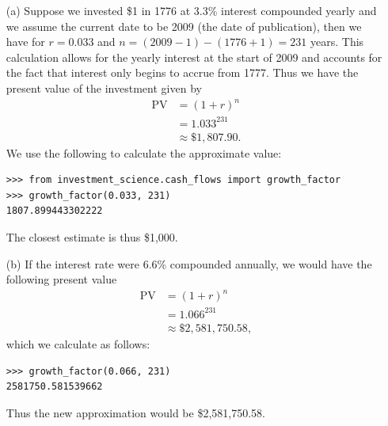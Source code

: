 \begin{itemize}
    \item[(a)] Suppose we invested \$1 in 1776 at 3.3\% interest compounded
        yearly and we assume the current date to be 2009 (the date of
        publication), then we have for $r = 0.033$ and
        $n = (2009 - 1) - (1776 + 1) = 231$ years. This calculation allows for
        the yearly interest at the start of 2009 and accounts for the fact that
        interest only begins to accrue from 1777. Thus we have the present value
        of the investment given by
        \begin{equation*}
            \begin{split}
                \text{PV} &= {(1 + r)}^n \\
                &= {1.033}^{231} \\
                &\approx \$1,807.90.
            \end{split}
        \end{equation*}
        We use the following to calculate the approximate value:
        \begin{lstlisting}
>>> from investment_science.cash_flows import growth_factor
>>> growth_factor(0.033, 231)
1807.899443302222
        \end{lstlisting}
        The closest estimate is thus \$1,000.
    \item[(b)] If the interest rate were 6.6\% compounded annually, we would
        have the following present value
        \begin{equation*}
            \begin{split}
                \text{PV} &= {(1 + r)}^n \\
                &= {1.066}^{231} \\
                &\approx \$2,581,750.58,
            \end{split}
        \end{equation*}
        which we calculate as follows:
        \begin{lstlisting}
>>> growth_factor(0.066, 231)
2581750.581539662
        \end{lstlisting}
        Thus the new approximation would be \$2,581,750.58.
\end{itemize}
